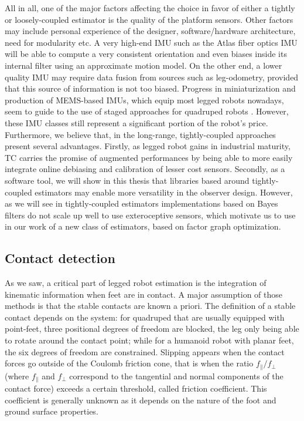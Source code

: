All in all, one of the major factors affecting the choice in favor of either a tightly or loosely-coupled estimator is the quality of the platform sensors. Other factors may include personal experience of the designer, software/hardware architecture, need for modularity etc. 
A very high-end IMU such as the Atlas fiber optics IMU will be able to compute a very consistent orientation and even biases inside its internal 
filter using an approximate motion model. On the other end, a lower quality IMU may require data fusion from sources such as leg-odometry, 
provided that this source of information is not too biased. Progress in miniaturization and production of MEMS-based IMUs, which equip most 
legged robots nowadays, seem to guide to the use of staged approaches for quadruped robots \cite{bledt2018cheetah, leziart2021implementation}. 
However, these IMU classes still represent a significant portion of the robot's price. Furthermore, we believe that, in the long-range, tightly-coupled
approaches present several advantages. Firstly, as legged robot gains in industrial maturity, TC carries the promise of augmented performances by being able
to more easily integrate online debiasing and calibration of lesser cost sensors. Secondly, as a software tool, we will show in this thesis that libraries based
around tightly-coupled estimators may enable more versatility in the observer design. However, as we will see in  
tightly-coupled estimators implementations based on Bayes filters do not scale up well to use exteroceptive sensors, which motivate us to use in our work of a
new class of estimators, based on factor graph optimization.



\subsection{Contact detection}
As we saw, a critical part of legged robot estimation is the integration of kinematic information when feet are in contact. A major
assumption of those methods is that the stable contacts are known a priori. The definition of a stable contact depends on the system: for quadruped that 
are usually equipped with point-feet, three positional degrees of freedom are blocked, the leg only being able to rotate around the contact point; 
while for a humanoid robot with planar feet, the six degrees of freedom are constrained. Slipping appears when the contact forces go outside of the Coulomb friction cone, 
that is when the ratio $f_{\parallel}/f_{\perp}$ (where $f_{\parallel}$ and $f_{\perp}$ correspond to the tangential and normal components of the contact force) 
exceeds a certain threshold, called friction coefficient. 
This coefficient is generally unknown as it depends on the nature of the foot and ground surface properties.

